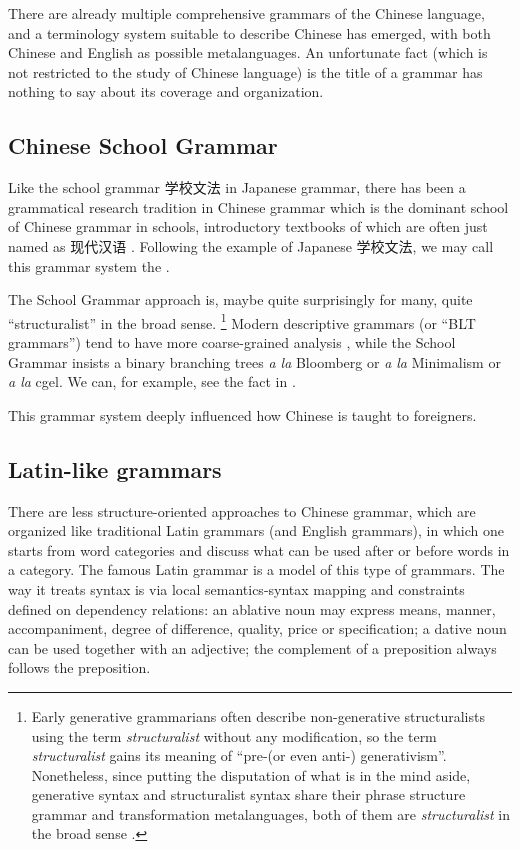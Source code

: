 There are already multiple comprehensive grammars of the Chinese language, and a terminology system 
suitable to describe Chinese has emerged, with both Chinese and English as possible metalanguages. 
An unfortunate fact (which is not restricted to the study of Chinese language) is the title of a grammar
has nothing to say about its coverage and organization. 

\subsection{Chinese School Grammar}\label{sec:school-grammar}

Like the school grammar 学校文法 in Japanese grammar, there has been a grammatical research tradition 
in Chinese grammar which is the dominant school of Chinese grammar in schools, introductory textbooks of 
which are often just named as 现代汉语 \citep[e.g.][]{xianhan2004}. Following the example of Japanese 
学校文法, we may call this grammar system the .

The School Grammar approach is, maybe quite surprisingly for many, quite ``structuralist'' in the broad 
sense.%
\footnote{
    Early generative grammarians often describe non-generative structuralists using the term \emph{structuralist}
    without any modification, so the term \emph{structuralist} gains its meaning of ``pre-(or even anti-)
    generativism''. Nonetheless, since putting the disputation of what is in the mind aside, 
    generative syntax and structuralist syntax share their phrase structure grammar and transformation 
    metalanguages, both of them are \emph{structuralist} in the broad sense \citep{newmeyer1986has}.
}%
Modern descriptive grammars (or ``BLT grammars'') tend to have more coarse-grained analysis \citep{dryer2006descriptive},
while the School Grammar insists a binary branching trees \emph{a la} Bloomberg or \emph{a la} Minimalism
or \emph{a la} \ac{cgel}. We can, for example, see the fact in .

This grammar system deeply influenced how Chinese is taught to foreigners. %

\subsection{Latin-like grammars}

There are less structure-oriented approaches to Chinese grammar, which are organized like traditional 
Latin grammars (and English grammars), in which one starts from word categories and discuss what can be 
used after or before words in a category. The famous Latin grammar \citet{greenough2013allen} is 
a model of this type of grammars. The way it treats syntax is via local semantics-syntax mapping 
and constraints defined on dependency relations: an ablative noun may express means, manner, 
accompaniment, degree of difference, quality, price or specification; a dative noun can be used 
together with an adjective; the complement of a preposition always follows the preposition.

